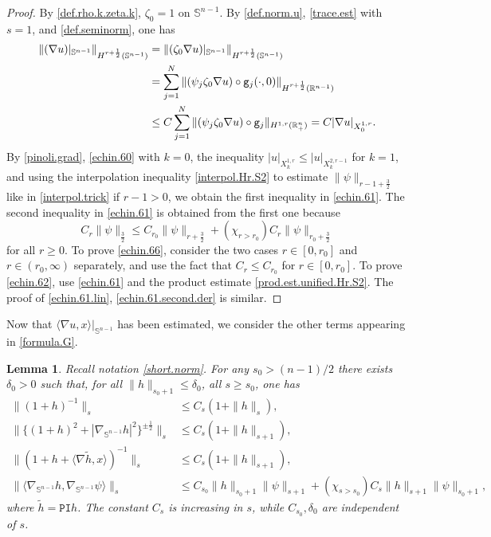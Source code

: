 \documentclass[10pt,reqno,a4paper]{article}
\numberwithin{equation}{section}
\theoremstyle{plain}
\newtheorem{lemma}[theorem]{Lemma}
\theoremstyle{definition}
\newcommand{\R}{{\mathbb R}}
\renewcommand{\S}{{\mathbb S}}
\newcommand{\la}{\langle}
\newcommand{\ra}{\rangle}
\newcommand{\grad}{\nabla}
\begin{document}
\begin{proof} 
By \eqref{def.rho.k.zeta.k}, $\zeta_0=1$ on $\S^{n-1}$.  
By \eqref{def.norm.u}, 
\eqref{trace.est} with $s=1$, 
and \eqref{def.seminorm}, one has  
\begin{align}
\| (\grad u)|_{\S^{n-1}} \|_{H^{r+\frac12}(\S^{n-1})} 
& = \| (\zeta_0 \grad u)|_{\S^{n-1}} \|_{H^{r+\frac12}(\S^{n-1})}  
\notag \\ & = \sum_{j=1}^N \| (\psi_j \zeta_0 \grad u) \circ \mathtt g_j( \cdot , 0) \|_{H^{r+\frac12}(\R^{n-1})}
\notag \\ & \leq C \sum_{j=1}^N \| (\psi_j \zeta_0 \grad u) \circ \mathtt g_j \|_{H^{1,r}(\R^n_+)}
= C |\grad u|_{X^{1,r}_0}.
\label{benef.1}
\end{align}
By \eqref{pinoli.grad}, 
\eqref{echin.60} with $k=0$, 
the inequality $|u|_{X^{1,r}_k} \leq |u|_{X^{2,r-1}_k}$ for $k=1$, 
and using the interpolation inequality \eqref{interpol.Hr.S2} to estimate $\| \psi \|_{r-1+\frac32}$ 
like in \eqref{interpol.trick} if $r-1 > 0$,
we obtain the first inequality in \eqref{echin.61}. 
The second inequality in \eqref{echin.61} is obtained from the first one because 
\begin{equation} \label{echin.66}
C_r \| \psi \|_{\frac32}
\leq C_{r_0} \| \psi \|_{r + \frac32}
+ (\chi_{r > r_0}) C_r \| \psi \|_{r_0 + \frac32}
\end{equation}
for all $r \geq 0$. To prove \eqref{echin.66}, 
consider the two cases $r \in [0, r_0]$ and $r \in (r_0,\infty)$ separately, 
and use the fact that $C_r \leq C_{r_0}$ for $r \in [0, r_0]$. 
To prove \eqref{echin.62}, use \eqref{echin.61} 
and the product estimate \eqref{prod.est.unified.Hr.S2}. 
The proof of \eqref{echin.61.lin}, \eqref{echin.61.second.der} is similar. 
\end{proof}


Now that $\la \grad u , x \ra|_{\S^{n-1}}$ has been estimated,  
we consider the other terms appearing in \eqref{formula.G}. 


\begin{lemma} \label{lemma:other.terms}
Recall notation \eqref{short.norm}. 
For any $s_0 > (n-1)/2$ there exists $\delta_0 > 0$ such that, 
for all $\| h \|_{s_0+1} \leq \delta_0$, all $s \geq s_0$, one has 
\begin{align*}
\| (1+h)^{-1} \|_s 
& \leq C_s (1 + \| h \|_{s}), 
\\
\| \{ (1+h)^2 + | \grad_{\S^{n-1}} h |^2 \}^{\pm \frac12} \|_{s} 
& \leq C_s (1 + \| h \|_{s+1}), 
\\
\| (1 + h + \la \grad \tilde h, x \ra)^{-1} \|_s
& \leq C_s (1 + \| h \|_{s+1}), 
\\
\| \la \grad_{\S^{n-1}} h, \grad_{\S^{n-1}} \psi \ra \|_{s} 
& \leq C_{s_0} \| h \|_{s_0+1} \| \psi \|_{s+1}
+ (\chi_{s > s_0}) C_s \| h \|_{s+1} \| \psi \|_{s_0+1},
\end{align*}
where $\tilde h = \mathtt{PI} h$. 
The constant $C_s$ is increasing in $s$,
while $C_{s_0}, \delta_0$ are independent of $s$. 
\end{lemma}
\end{document}
